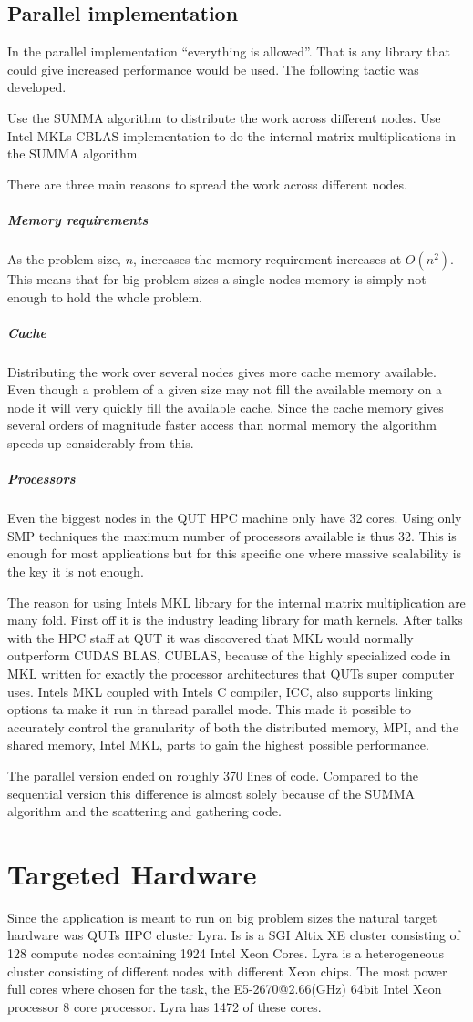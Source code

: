 \documentclass{article}
\begin{document}
\subsection{Parallel implementation}
In the parallel implementation ``everything is allowed''. That is any library that could give
increased performance would be used. The following tactic was developed.

Use the SUMMA algorithm to distribute the work across different nodes. Use Intel MKLs CBLAS implementation
to do the internal matrix multiplications in the SUMMA algorithm.

There are three main reasons to spread the work across different nodes.
\subparagraph{Memory requirements}
As the problem size, $n$, increases the memory requirement increases at $O(n^2)$. This means that for
big problem sizes a single nodes memory is simply not enough to hold the whole problem.
\subparagraph{Cache}
Distributing the work over several nodes gives more cache memory available. Even though a problem
of a given size may not fill the available memory on a node it will very quickly fill the available
cache. Since the cache memory gives several orders of magnitude faster access than normal memory
the algorithm speeds up considerably from this.
\subparagraph{Processors}
Even the biggest nodes in the QUT HPC machine only have 32 cores. Using only SMP techniques
the maximum number of processors available is thus 32. This is enough for most applications but
for this specific one where massive scalability is the key it is not enough.

The reason for using Intels MKL library for the internal matrix multiplication are many fold. First
off it is the industry leading library for math kernels. After talks with the HPC staff at QUT it was
discovered that MKL would normally outperform CUDAS BLAS, CUBLAS, because of the highly specialized code
in MKL written for exactly the processor architectures that QUTs super computer uses. Intels MKL coupled
with Intels C compiler, ICC, also supports linking options ta make it run in thread parallel mode. This
made it possible to accurately control the granularity of both the distributed memory, MPI, and the
shared memory, Intel MKL, parts to gain the highest possible performance.

The parallel version ended on roughly 370 lines of code. Compared to the sequential version this difference
is almost solely because of the SUMMA algorithm and the scattering and gathering code.

\section{Targeted Hardware}
Since the application is meant to run on big problem sizes the natural target hardware was QUTs
HPC cluster Lyra. Is is a SGI Altix XE cluster consisting of 128 compute nodes containing 1924 Intel Xeon Cores. Lyra is a
heterogeneous cluster consisting of different nodes with different Xeon chips.
The most power full cores where chosen for the task, the E5-2670@2.66(GHz) 64bit Intel Xeon processor 8 core processor.
Lyra has 1472 of these cores.
\end{document}
